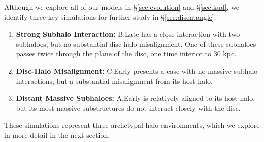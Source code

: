 Although we explore all of our models in \S\ref{sec:evolution} and \S\ref{sec:kud}, we identify three key simulations for further study in \S\ref{sec:disentangle}.
\begin{enumerate}
\item \textbf{Strong Subhalo Interaction:} B.Late has a close interaction with two subhaloes, but no substantial disc-halo misalignment. One of these subhaloes passes twice through the plane of the disc, one time interior to 30 kpc.
\item \textbf{Disc-Halo Misalignment:} C.Early presents a case with no massive subhalo interactions, but a substantial misalignment from its host halo.
\item \textbf{Distant Massive Subhaloes:} A.Early is relatively aligned to its host halo, but its most massive substructures do not interact closely with the disc.
\end{enumerate}
These simulations represent three archetypal halo environments, which we explore in more detail in the next section.

